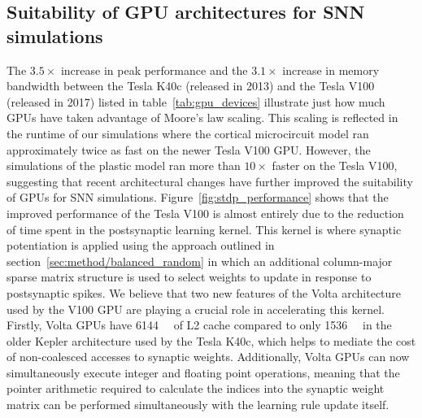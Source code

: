 \documentclass[utf8]{frontiersSCNS} %
\begin{document}
\subsection{Suitability of GPU architectures for SNN simulations}
The $3.5\times$ increase in peak performance and the $3.1\times$ increase in memory bandwidth between the Tesla K40c (released in 2013) and the Tesla V100 (released in 2017) listed in table~\ref{tab:gpu_devices} illustrate just how much GPUs have taken advantage of Moore's law scaling.
This scaling is reflected in the runtime of our simulations where the cortical microcircuit model ran approximately twice as fast on the newer Tesla V100 GPU.
However, the simulations of the plastic model ran more than $10\times$ faster on the Tesla V100, suggesting that recent architectural changes have further improved the suitability of GPUs for SNN simulations.
Figure~\ref{fig:stdp_performance} shows that the improved performance of the Tesla V100 is almost entirely due to the reduction of time spent in the postsynaptic learning kernel.
This kernel is where synaptic potentiation is applied using the approach outlined in section~\ref{sec:method/balanced_random} in which an additional column-major sparse matrix structure is used to select weights to update in response to postsynaptic spikes.
We believe that two new features of the Volta architecture~\citep{Nvidia2017} used by the V100 GPU are playing a crucial role in accelerating this kernel.
Firstly, Volta GPUs have \SI{6144}{\kibi\byte} of L2 cache compared to
only \SI{1536}{\kibi\byte} in the older Kepler architecture used by
the Tesla K40c, which helps to mediate the cost of non-coalesced accesses to synaptic weights.
Additionally, Volta GPUs can now simultaneously execute integer and floating point operations, meaning that the pointer arithmetic required to calculate the indices into the synaptic weight matrix can be performed simultaneously with the learning rule update itself.
\end{document}
